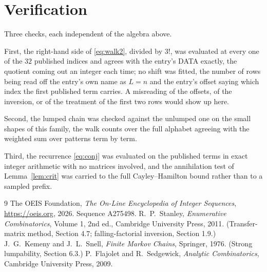 \documentclass[11pt,a4paper]{article}
\theoremstyle{plain}
\theoremstyle{definition}
\begin{document}
\section{Verification}

Three checks, each independent of the algebra above.

First, the right-hand side of \eqref{eq:walk2}, divided by $3!$, was evaluated at every
one of the $32$ published indices and agrees with the entry's DATA exactly, the quotient
coming out an integer each time; no shift was fitted, the number of rows being read off the
entry's own name as $L=n$ and the entry's offset saying which index the first published
term carries. A misreading of the offsets, of the inversion, or of the treatment of the first
two rows would show up here.

Second, the lumped chain was checked against the unlumped one on the small shapes of this
family, the walk counts over the full alphabet agreeing with the weighted sum over patterns
term by term.

Third, the recurrence \eqref{eq:conj} was evaluated on the published terms in exact integer
arithmetic with no matrices involved, and the annihilation test of Lemma~\ref{lem:crit} was
carried to the full Cayley--Hamilton bound rather than to a sampled prefix.

\begin{thebibliography}{9}
 The OEIS Foundation, \emph{The On-Line Encyclopedia of Integer
Sequences}, \url{https://oeis.org}, 2026. Sequence A275498.
 R.~P.~Stanley, \emph{Enumerative Combinatorics}, Volume 1, 2nd ed.,
Cambridge University Press, 2011. (Transfer-matrix method, Section 4.7; falling-factorial
inversion, Section 1.9.)
 J.~G.~Kemeny and J.~L.~Snell, \emph{Finite Markov Chains}, Springer,
1976. (Strong lumpability, Section 6.3.)
 P.~Flajolet and R.~Sedgewick, \emph{Analytic Combinatorics}, Cambridge
University Press, 2009.
\end{thebibliography}
\end{document}
